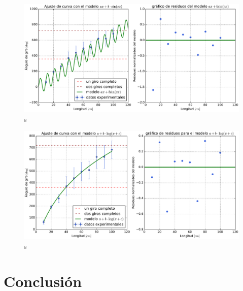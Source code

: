 \documentclass{article}
\begin{document}
\begin{figure}[ht]
    \centering
    \includegraphics[scale=0.5]{Informe/img/grafico-modelo-asinb.pdf}
    \caption{s}
    \label{fig:asinb}
\end{figure}

\begin{figure}[ht]
    \centering
    \includegraphics[scale=0.5]{Informe/img/grafico-modelo-alogb.pdf}
    \caption{s}
    \label{fig:alogb}
\end{figure}

\section{Conclusión}




\end{document}
